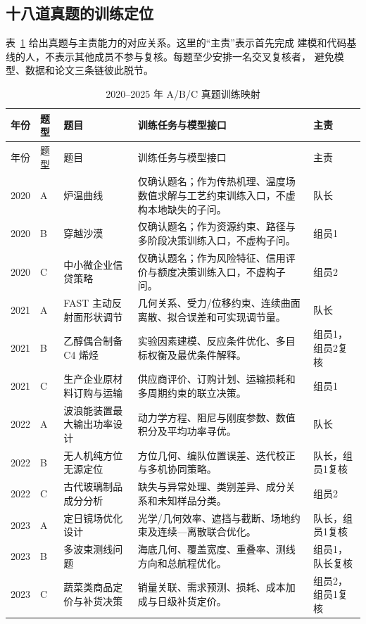 \subsection{十八道真题的训练定位}

表~\ref{tab:problems} 给出真题与主责能力的对应关系。这里的“主责”表示首先完成
建模和代码基线的人，不表示其他成员不参与复核。每题至少安排一名交叉复核者，
避免模型、数据和论文三条链彼此脱节。

\begin{longtable}{p{1.2cm}p{1.3cm}p{3.3cm}p{6.0cm}p{1.9cm}}
\caption{2020--2025 年 A/B/C 真题训练映射}\label{tab:problems}\\
\toprule
年份 & 题型 & 题目 & 训练任务与模型接口 & 主责\\
\midrule
\endfirsthead
\toprule
年份 & 题型 & 题目 & 训练任务与模型接口 & 主责\\
\midrule
\endhead
2020 & A & 炉温曲线 & 仅确认题名；作为传热机理、温度场数值求解与工艺约束训练入口，不虚构本地缺失的子问。 & 队长\\
2020 & B & 穿越沙漠 & 仅确认题名；作为资源约束、路径与多阶段决策训练入口，不虚构子问。 & 组员1\\
2020 & C & 中小微企业信贷策略 & 仅确认题名；作为风险特征、信用评价与额度决策训练入口，不虚构子问。 & 组员2\\
2021 & A & FAST 主动反射面形状调节 & 几何关系、受力/位移约束、连续曲面离散、拟合误差和可实现调节量。 & 队长\\
2021 & B & 乙醇偶合制备 C4 烯烃 & 实验因素建模、反应条件优化、多目标权衡及最优条件解释。 & 组员1，组员2复核\\
2021 & C & 生产企业原材料订购与运输 & 供应商评价、订购计划、运输损耗和多周期约束的联立决策。 & 组员1\\
2022 & A & 波浪能装置最大输出功率设计 & 动力学方程、阻尼与刚度参数、数值积分及平均功率寻优。 & 队长\\
2022 & B & 无人机纯方位无源定位 & 方位几何、编队位置误差、迭代校正与多机协同策略。 & 队长，组员1复核\\
2022 & C & 古代玻璃制品成分分析 & 缺失与异常处理、类别差异、成分关系和未知样品分类。 & 组员2\\
2023 & A & 定日镜场优化设计 & 光学/几何效率、遮挡与截断、场地约束及连续—离散联合优化。 & 队长，组员1复核\\
2023 & B & 多波束测线问题 & 海底几何、覆盖宽度、重叠率、测线方向和总航程优化。 & 组员1，队长复核\\
2023 & C & 蔬菜类商品定价与补货决策 & 销量关联、需求预测、损耗、成本加成与日级补货定价。 & 组员2，组员1复核\\

\end{longtable}
